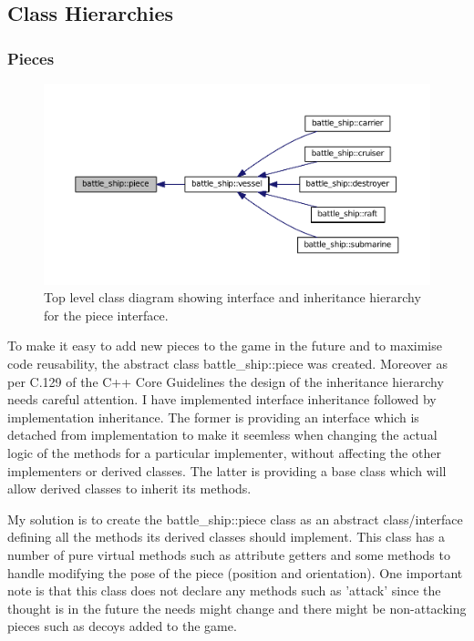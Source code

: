 \documentclass[11pt]{article} %
\begin{document}
\subsection{Class Hierarchies}
\subsubsection{Pieces}
\begin{figure}[H]
\centering
\includegraphics[scale=0.6]{images/piece.pdf}
\caption{Top level class diagram showing interface and inheritance hierarchy for the piece interface.}
\label{fig:piece_class_diagram}
\end{figure}
To make it easy to add new pieces to the game in the future and to maximise code reusability, the abstract class
battle\_ship::piece was created.
Moreover as per C.129 of the C++ Core Guidelines the design of the inheritance hierarchy needs careful attention.
I have implemented interface inheritance followed by implementation inheritance.
The former is providing an interface which is detached from implementation
to make it seemless when changing the actual logic of the methods for a particular implementer, without
affecting the other implementers or derived classes.
The latter is providing a base class which will allow derived classes to inherit its methods.
\\
\par My solution is to create the battle\_ship::piece class as an abstract class/interface defining all the methods its derived classes should implement.
This class has a number of pure virtual methods such as attribute getters and some methods to handle modifying the pose of the piece (position and orientation).
One important note is that this class does not declare any methods such as 'attack' since the thought is
in the future the needs might change and there might be non-attacking pieces such as decoys added to the game.
\end{document}
